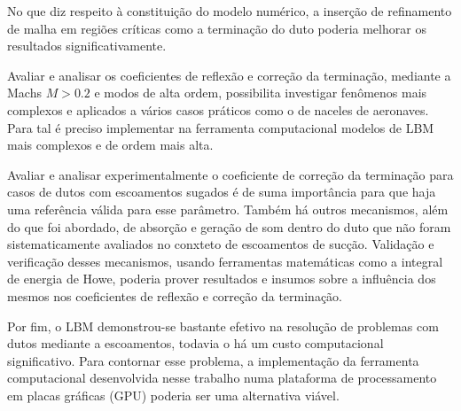No que diz respeito à constituição do modelo numérico, a inserção de refinamento de malha em regiões críticas como a terminação do duto poderia melhorar os resultados significativamente.

Avaliar e analisar os coeficientes de reflexão e correção da terminação, mediante a Machs $M > 0.2$ e modos de alta ordem, possibilita investigar fenômenos mais complexos e aplicados a vários casos práticos como o de naceles de aeronaves. Para tal é preciso implementar na ferramenta computacional modelos de LBM mais complexos e de ordem mais alta.

Avaliar e analisar experimentalmente o coeficiente de correção da terminação para casos de dutos com escoamentos sugados é de suma importância para que haja uma referência válida para esse parâmetro. Também há outros mecanismos, além do que foi abordado, de absorção e geração de som dentro do duto que não foram sistematicamente avaliados no conxteto de escoamentos de sucção. Validação e verificação desses mecanismos, usando ferramentas matemáticas como a integral de energia de Howe, poderia prover resultados e insumos sobre a influência dos mesmos nos coeficientes de reflexão e correção da terminação.

Por fim, o LBM demonstrou-se bastante efetivo na resolução de problemas com dutos mediante a escoamentos, todavia o há um custo computacional significativo. Para contornar esse problema, a implementação da ferramenta computacional desenvolvida nesse trabalho numa plataforma de processamento em placas gráficas (GPU) poderia ser uma alternativa viável.   